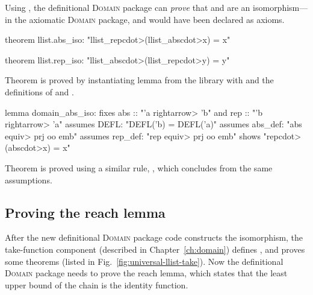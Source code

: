 Using , the definitional \textsc{Domain} package can \emph{prove} that  and  are an isomorphism---in the axiomatic \textsc{Domain} package,  and  would have been declared as axioms.
%
\begin{isacode}
theorem llist.abs_iso: "llist_rep\<cdot>(llist_abs\<cdot>x) = x"
\end{isacode}
\unmedskip
{}
\begin{isacode}
theorem llist.rep_iso: "llist_abs\<cdot>(llist_rep\<cdot>y) = y"
\end{isacode}
%
Theorem  is proved by instantiating lemma  from the library with  and the definitions of  and .
%
\begin{isacode}
lemma domain_abs_iso:
  fixes abs :: "'a \<rightarrow> 'b" and rep :: "'b \<rightarrow> 'a"
  assumes DEFL: "DEFL('b) = DEFL('a)"
  assumes abs_def: "abs \<equiv> prj oo emb"
  assumes rep_def: "rep \<equiv> prj oo emb"
  shows "rep\<cdot>(abs\<cdot>x) = x"
\end{isacode}
%
Theorem  is proved using a similar rule, , which concludes  from the same assumptions.

\subsection{Proving the reach lemma}
\label{sec:universal-package-reach}

After the new definitional \textsc{Domain} package code constructs the isomorphism, the take-function component (described in Chapter~\ref{ch:domain}) defines , and proves some theorems (listed in Fig.~\ref{fig:universal-llist-take}). Now the definitional \textsc{Domain} package needs to prove the reach lemma, which states that the least upper bound of the chain  is the identity function.

